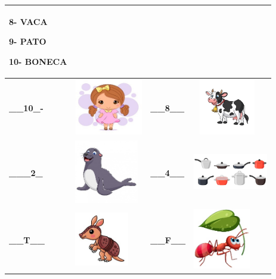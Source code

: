 {\begin{longtable}[]{@{}llll@{}}
\begin{minipage}[b]{0.24\columnwidth}
\textbf{8- VACA}

\textbf{9- PATO}

\textbf{10- BONECA}\strut
\end{minipage}\tabularnewline
\midrule
\endhead
\textbf{\_\_10\_-} &
\includegraphics[width=1.16667in,height=0.96319in]{media/image16.jpeg} &
\textbf{\_\_8\_\_} &
\includegraphics[width=1.16127in,height=0.95833in]{media/image17.jpeg}\tabularnewline
\textbf{\_\_\_2\_} &
\includegraphics[width=1.09375in,height=1.09375in]{media/image18.jpeg} &
\textbf{\_\_4\_\_} &
\includegraphics[width=1.27986in,height=0.98958in]{media/image19.jpeg}\tabularnewline
\textbf{\_\_T\_\_} &
\includegraphics[width=0.92708in,height=0.92708in]{media/image20.jpeg} &
\textbf{\_\_F\_\_} &
\includegraphics[width=0.97986in,height=1.05208in]{media/image21.jpeg}\tabularnewline

\end{longtable}}
